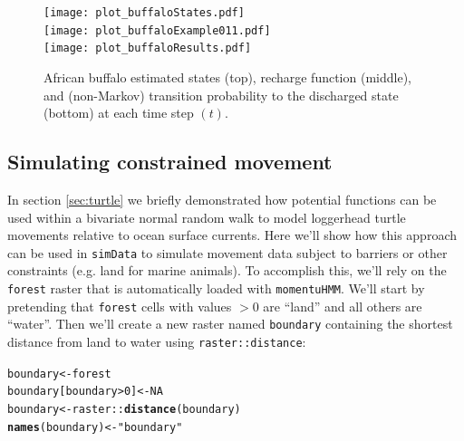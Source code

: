 \documentclass[12pt]{article}\usepackage[]{graphicx}\usepackage[]{xcolor}
\makeatletter
\newcommand{\hlnum}[1]{\textcolor[rgb]{0.686,0.059,0.569}{#1}}%
\newcommand{\hlsng}[1]{\textcolor[rgb]{0.192,0.494,0.8}{#1}}%
\newcommand{\hlopt}[1]{\textcolor[rgb]{0,0,0}{#1}}%
\newcommand{\hldef}[1]{\textcolor[rgb]{0.345,0.345,0.345}{#1}}%
\newcommand{\hlkwb}[1]{\textcolor[rgb]{0.69,0.353,0.396}{#1}}%
\newcommand{\hlkwd}[1]{\textcolor[rgb]{0.737,0.353,0.396}{\textbf{#1}}}%
\newenvironment{kframe}{%
 \def\at@end@of@kframe{}%
 \ifinner\ifhmode%
  \def\at@end@of@kframe{\end{minipage}}%
  \begin{minipage}{\columnwidth}%
 \fi\fi%
 \def\FrameCommand##1{\hskip\@totalleftmargin \hskip-\fboxsep
 \colorbox{shadecolor}{##1}\hskip-\fboxsep
     \hskip-\linewidth \hskip-\@totalleftmargin \hskip\columnwidth}%
 \MakeFramed {\advance\hsize-\width
   \@totalleftmargin\z@ \linewidth\hsize
   \@setminipage}}%
 {\par\unskip\endMakeFramed%
 \at@end@of@kframe}
\newenvironment{knitrout}{}{} %
\makeatother
\begin{document}
\begin{figure}[htbp]
  \centering
  \texttt{[image: plot\_buffaloStates.pdf]}\\
  \texttt{[image: plot\_buffaloExample011.pdf]}\\
  \texttt{[image: plot\_buffaloResults.pdf]}\\
  \caption{African buffalo estimated states (top), recharge function (middle), and (non-Markov) transition probability to the discharged state (bottom) at each time step $(t)$.}
  \label{fig:recharge}
\end{figure}

\subsection{Simulating constrained movement}
\label{sec:avoidLand}
In section \ref{sec:turtle} we briefly demonstrated how potential functions can be used within a bivariate normal random walk to model loggerhead turtle movements relative to ocean surface currents. Here we'll show how this approach can be used in \verb|simData| to simulate movement data subject to barriers or other constraints (e.g. land for marine animals). To accomplish this, we'll rely on the \verb|forest| raster that is automatically loaded with \verb|momentuHMM|. We'll start by pretending that \verb|forest| cells with values $>0$ are ``land'' and all others are ``water''.  Then we'll create a new raster named \verb|boundary| containing the shortest distance from land to water using \verb|raster::distance|:
\begin{knitrout}
\color{fgcolor}\begin{kframe}
\begin{alltt}
\hldef{boundary} \hlkwb{<-} \hldef{forest}
\hldef{boundary[boundary}\hlopt{>}\hlnum{0}\hldef{]} \hlkwb{<-} \hlnum{NA}
\hldef{boundary} \hlkwb{<-} \hldef{raster}\hlopt{::}\hlkwd{distance}\hldef{(boundary)}
\hlkwd{names}\hldef{(boundary)} \hlkwb{<-} \hlsng{"boundary"}
\end{alltt}
\end{kframe}
\end{knitrout}
\end{document}
